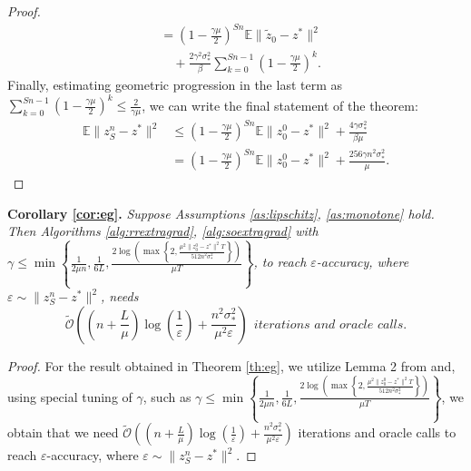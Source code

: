 \documentclass{article}
\begin{document}
\begin{proof}
\begin{align*}
            & = \left(1-\frac{\gamma\mu}{2}\right)^{Sn}\mathbb{E} \|\widetilde{z}_0 - z^*\|^2\\
            & \quad + \frac{2\gamma^2\sigma_*^2}{\beta}\sum\limits_{k = 0}^{Sn-1}\left(1-\frac{\gamma\mu}{2}\right)^{k}.
        \end{align*}
        Finally, estimating geometric progression in the last term as $\sum\limits_{k = 0}^{Sn-1}\left(1-\frac{\gamma\mu}{2}\right)^{k} \leqslant \frac{2}{\gamma\mu}$, we can write the final statement of the theorem:
        \begin{align*}
            \mathbb{E} \|z_S^n - z^*\|^2 & \leqslant \left(1-\frac{\gamma\mu}{2}\right)^{Sn}\mathbb{E} \|z_0^0 - z^*\|^2 + \frac{4\gamma\sigma_*^2}{\beta\mu}\\
            & = \left(1-\frac{\gamma\mu}{2}\right)^{Sn}\mathbb{E} \|z_0^0 - z^*\|^2 + \frac{256\gamma n^2\sigma_*^2}{\mu}.
        \end{align*}
    \end{proof}
\textbf{Corollary \ref{cor:eg}.}
\textit{Suppose Assumptions \ref{as:lipschitz}, \ref{as:monotone} hold. Then Algorithms \ref{alg:rrextragrad}, \ref{alg:soextragrad} with $\gamma \leqslant \min\left\{\frac{1}{2\mu n}, \frac{1}{6L}, \frac{2\log\left(\max\left\{2, \frac{\mu^2\|z_0^0 - z^*\|^2 T}{512 n^2\sigma^2_*}\right\}\right)}{\mu T}\right\}$, to reach $\varepsilon$-accuracy, where $\varepsilon \sim \|z_S^n - z^*\|^2$, needs}
    \begin{equation*}
    \mathcal{\widetilde{O}}\left(\left(n + \frac{L}{\mu}\right)\log\left(\frac{1}{\varepsilon}\right) + \frac{n^2\sigma^2_*}{\mu^2\varepsilon}\right) ~~\textit{iterations and oracle calls.}
    \end{equation*}
\begin{proof}
    For the result obtained in Theorem \ref{th:eg}, we utilize Lemma 2 from \citep{stich2019unified} and, using special tuning of $\gamma$, such as $\gamma \leqslant \min\left\{\frac{1}{2\mu n}, \frac{1}{6L}, \frac{2\log\left(\max\left\{2, \frac{\mu^2\|z_0^0 - z^*\|^2 T}{512 n^2\sigma^2_*}\right\}\right)}{\mu T}\right\}$, we obtain that we need $\mathcal{\widetilde{O}}\left(\left(n + \frac{L}{\mu}\right)\log\left(\frac{1}{\varepsilon}\right) + \frac{n^2\sigma^2_*}{\mu^2\varepsilon}\right)$ iterations and oracle calls to reach $\varepsilon$-accuracy, where $\varepsilon \sim \|z_S^n - z^*\|^2$.
\end{proof}
\end{document}
